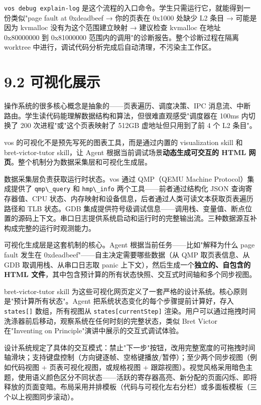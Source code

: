 \documentclass[UTF8,a4paper,12pt,openany]{ctexrep}
\newcommand{\passthrough}[1]{#1}
\begin{document}
\passthrough{\lstinline!vos debug explain-log!} 是这个流程的入口命令。学生只需运行它，就能得到一份类似"page fault at 0xdeadbeef → 你的页表在 0x1000 处缺少 L2 条目 → 可能是因为 kvmalloc 没有为这个范围建立映射 → 建议检查 kvmalloc 在地址 0x80000000 到 0x81000000 范围内的调用"的诊断报告。整个诊断过程在隔离 worktree 中进行，调试代码分析完成后自动清理，不污染主工作区。

\section{9.2 可视化展示}\label{92-ux53efux89c6ux5316ux5c55ux793a}

操作系统的很多核心概念是抽象的------页表遍历、调度决策、IPC 消息流、中断路由。学生读代码能理解数据结构和算法，但很难直观感受"调度器在 100ms 内切换了 200 次进程"或"这个页表映射了 512GB 虚地址但只用到了前 4 个 L2 条目"。

vos 的可视化不是预先写死的图表工具，而是通过内置的 visualization skill 和 bret-victor-tutor skill，让 Agent 根据当前调试场景\textbf{动态生成可交互的 HTML 网页}。整个机制分为数据采集层和可视化生成层。

数据采集层负责获取运行时状态。vos 通过 QMP（QEMU Machine Protocol）集成提供了 \passthrough{\lstinline!qmp\_query!} 和 \passthrough{\lstinline!hmp\_info!} 两个工具------前者通过结构化 JSON 查询寄存器值、CPU 状态、内存映射和设备信息，后者通过人类可读文本获取页表遍历路径和 TLB 状态。GDB 集成提供符号级调试信息------调用栈、变量值、断点位置的源码上下文。串口日志提供系统启动和运行时的完整输出流。三种数据源互补构成完整的运行时观测能力。

可视化生成层是这套机制的核心。Agent 根据当前任务------比如"解释为什么 page fault 发生在 0xdeadbeef"------自主决定需要哪些数据（从 QMP 取页表信息、从 GDB 取调用栈、从串口日志取 panic 上下文），然后生成一个\textbf{独立的、自包含的 HTML 文件}，其中包含预计算的所有状态快照、交互式时间轴和多个同步视图。

bret-victor-tutor skill 为这些可视化网页定义了一套严格的设计系统。核心原则是"预计算所有状态"。Agent 把系统状态变化的每个步骤提前计算好，存入 \passthrough{\lstinline!states[]!} 数组，所有视图从 \passthrough{\lstinline!states[currentStep]!} 渲染。用户可以通过拖拽时间洗涤器前后移动，观察系统在任何时刻的完整状态，类似 Bret Victor 在"Inventing on Principle"演讲中展示的交互式调试体验。

设计系统规定了具体的交互模式：禁止"下一步"按钮，改用完整宽度的可拖拽时间轴滑块；支持键盘控制（方向键逐帧、空格键播放/暂停）；至少两个同步视图（例如代码视图 + 页表可视化视图，或规格视图 + 跟踪视图）。视觉风格采用暗色主题，使用语义颜色区分不同状态------活跃的寄存器高亮、新分配的页面闪烁、即将释放的页面变暗。布局采用并排模板（代码与可视化左右分栏）或多面板模板（三个以上视图同步滚动）。
\end{document}
